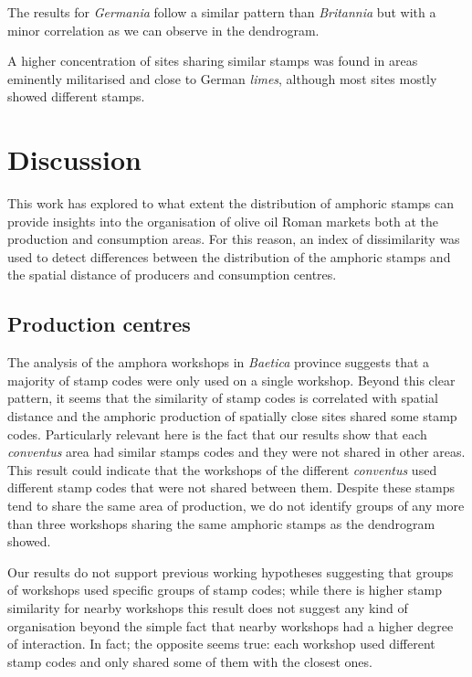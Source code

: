 The results for \textit{Germania} follow a similar pattern than \textit{Britannia} but with a minor correlation as we can observe in the dendrogram.

A higher concentration of sites sharing similar stamps was found in areas eminently militarised and close to German \textit{limes}, although most sites mostly showed different stamps. 

\section{Discussion}
\label{sec:7}

This work has explored to what extent the distribution of amphoric stamps can provide insights into the organisation of olive oil Roman markets both at the production and consumption areas. For this reason, an index of dissimilarity was used to detect differences between the distribution of the amphoric stamps and the spatial distance of producers and consumption centres. 

\subsection{Production centres}
\label{sec:7}

The analysis of the amphora workshops in \textit{Baetica} province suggests that a majority of stamp codes were only used on a single workshop. Beyond this clear pattern, it seems that the similarity of stamp codes is correlated with spatial distance and the amphoric production of spatially close sites shared some stamp codes. Particularly relevant here is the fact that our results show that each \textit{conventus} area had similar stamps codes and they were not shared in other areas. This result could indicate that the workshops of the different \textit{conventus} used different stamp codes that were not shared between them. Despite these stamps tend to share the same area of production, we do not identify groups of any more than three workshops sharing the same amphoric stamps as the dendrogram showed. 

Our results do not support previous working hypotheses suggesting that groups of workshops used specific groups of stamp codes; while there is higher stamp similarity for nearby workshops this result does not suggest any kind of organisation beyond the simple fact that nearby workshops had a higher degree of interaction. In fact; the opposite seems true: each workshop used different stamp codes and only shared some of them with the closest ones. 

